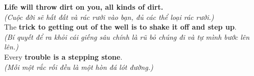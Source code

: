 \begin{baihoc}
  \textbf{Life will throw dirt on you, all kinds of dirt.}\\
  \textit{(Cuộc đời sẽ hất đất và rác rưởi vào bạn, đủ các thể loại rác rưởi.)}\\
  The \textbf{trick to getting out of the well is to shake it off and step up}.\\
  \textit{(Bí quyết để ra khỏi cái giếng sâu chính là rũ bỏ chúng đi và tự mình bước lên lên.)}\\
  Every \textbf{trouble is a stepping stone}.\\
  \textit{(Mỗi một rắc rối đều là một hòn đá lót đường.)}
\end{baihoc}

\vspace{0.8cm}


\ngayDay{}


